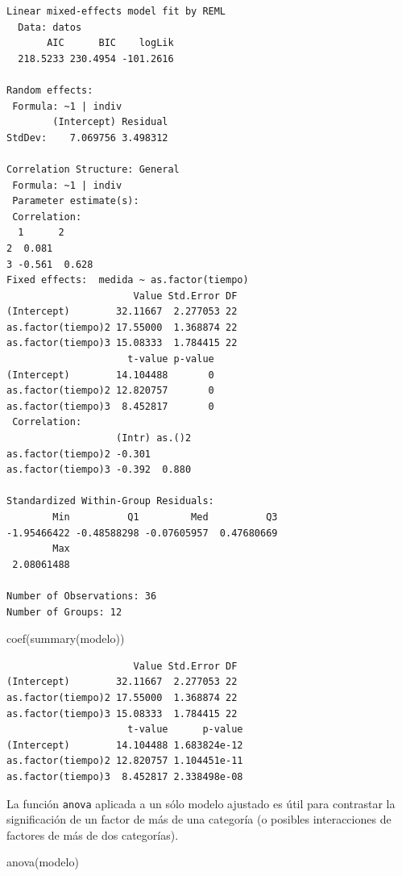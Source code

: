 \documentclass[
]{book}
\newenvironment{Shaded}{\begin{snugshade}}{\end{snugshade}}
\newcommand{\FunctionTok}[1]{\textcolor[rgb]{0.00,0.00,0.00}{#1}}
\newcommand{\NormalTok}[1]{#1}
\begin{document}
\begin{verbatim}
Linear mixed-effects model fit by REML
  Data: datos 
       AIC      BIC    logLik
  218.5233 230.4954 -101.2616

Random effects:
 Formula: ~1 | indiv
        (Intercept) Residual
StdDev:    7.069756 3.498312

Correlation Structure: General
 Formula: ~1 | indiv 
 Parameter estimate(s):
 Correlation: 
  1      2     
2  0.081       
3 -0.561  0.628
Fixed effects:  medida ~ as.factor(tiempo) 
                      Value Std.Error DF
(Intercept)        32.11667  2.277053 22
as.factor(tiempo)2 17.55000  1.368874 22
as.factor(tiempo)3 15.08333  1.784415 22
                     t-value p-value
(Intercept)        14.104488       0
as.factor(tiempo)2 12.820757       0
as.factor(tiempo)3  8.452817       0
 Correlation: 
                   (Intr) as.()2
as.factor(tiempo)2 -0.301       
as.factor(tiempo)3 -0.392  0.880

Standardized Within-Group Residuals:
        Min          Q1         Med          Q3 
-1.95466422 -0.48588298 -0.07605957  0.47680669 
        Max 
 2.08061488 

Number of Observations: 36
Number of Groups: 12 
\end{verbatim}

\begin{Shaded}
\begin{Highlighting}[]
\FunctionTok{coef}\NormalTok{(}\FunctionTok{summary}\NormalTok{(modelo))}
\end{Highlighting}
\end{Shaded}

\begin{verbatim}
                      Value Std.Error DF
(Intercept)        32.11667  2.277053 22
as.factor(tiempo)2 17.55000  1.368874 22
as.factor(tiempo)3 15.08333  1.784415 22
                     t-value      p-value
(Intercept)        14.104488 1.683824e-12
as.factor(tiempo)2 12.820757 1.104451e-11
as.factor(tiempo)3  8.452817 2.338498e-08
\end{verbatim}

La función \texttt{anova} aplicada a un sólo modelo ajustado es útil para contrastar la significación de un factor de más de una categoría (o posibles interacciones de factores de más de dos categorías).

\begin{Shaded}
\begin{Highlighting}[]
\FunctionTok{anova}\NormalTok{(modelo)}
\end{Highlighting}
\end{Shaded}
\end{document}
